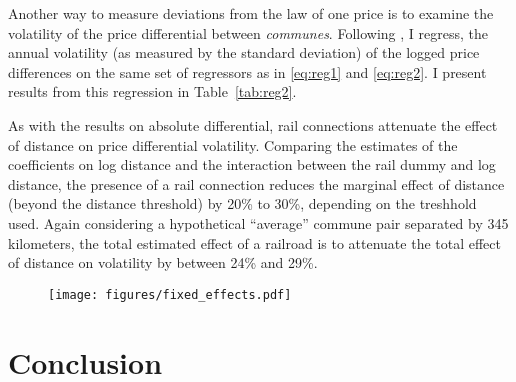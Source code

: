 \documentclass[12pt,twoside]{article}
\begin{document}
\begin{landscape}
	
\end{landscape}

Another way to measure deviations from the law of one price is to examine the volatility of the price differential between \emph{communes}.
Following \cite{engelrogers}, I regress, the annual volatility (as measured by the standard deviation) of the logged price differences on the same set of regressors as in \eqref{eq:reg1} and \eqref{eq:reg2}.
I present results from this regression in Table~\ref{tab:reg2}.

As with the results on absolute differential, rail connections attenuate the effect of distance on price differential volatility.
Comparing the estimates of the coefficients on log distance and the interaction between the rail dummy and log distance, the presence of a rail connection reduces the marginal effect of distance (beyond the distance threshold) by 20\% to 30\%, depending on the treshhold used.
Again considering a hypothetical ``average'' commune pair separated by 345 kilometers, the total estimated effect of a railroad is to attenuate the total effect of distance on volatility by between 24\% and 29\%.

\begin{landscape}
	
\end{landscape}



\begin{figure}[ht]
	\texttt{[image: figures/fixed\_effects.pdf]}
	\label{fig:fixedeffects}
\end{figure}


\section{Conclusion}

\newpage


 
\end{document}
